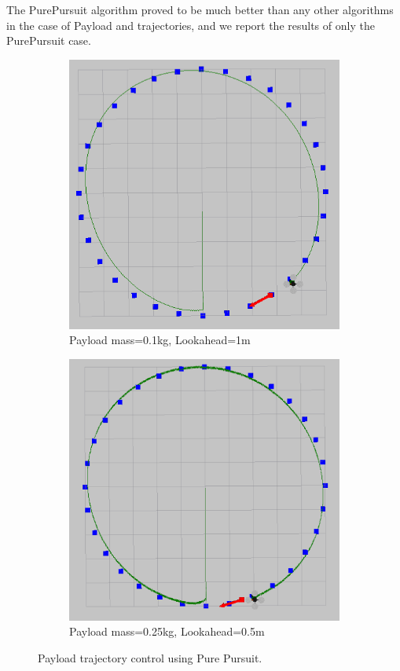 \documentclass[hidelinks,BTech]{iitmdiss}
\begin{document}
The PurePursuit algorithm proved to be much better than any other algorithms in the case of Payload and trajectories, and we report the results of only the PurePursuit case. 
\begin{figure}[H]
  \centering
  \begin{subfigure}[t]{0.48\textwidth}
  \includegraphics[width=\textwidth]{Pure_Pursuit_1_payload_0_1.png}
      \caption{Payload mass=0.1kg, Lookahead=1m}
  \end{subfigure}
  \begin{subfigure}[t]{0.48\textwidth}
    \centering
      \includegraphics[width=\textwidth]{Pure_Pursuit_0_5_payload_0_25.png}
      \caption{Payload mass=0.25kg, Lookahead=0.5m}
  \end{subfigure}
  \caption{Payload trajectory control using Pure Pursuit.}
\end{figure}
\end{document}
